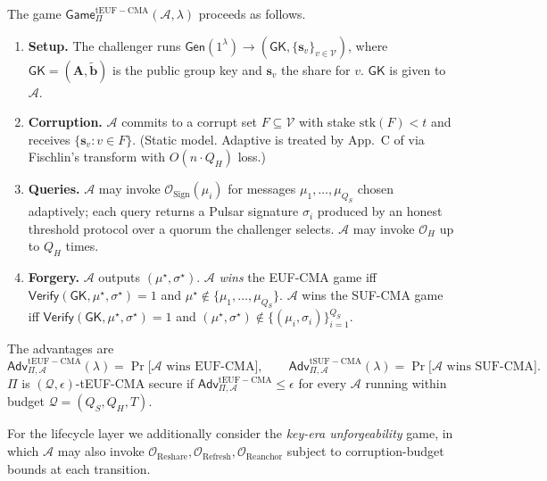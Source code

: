 \begin{definition}
\label{def:tuf-cma}
The game $\mathsf{Game}^{\mathrm{tEUF-CMA}}_{\Pi}(\mathcal{A}, \lambda)$
proceeds as follows.
\begin{enumerate}[nosep, leftmargin=2em]
  \item \textbf{Setup.} The challenger runs $\mathsf{Gen}(1^\lambda) \to
        (\mathsf{GK}, \{\mathbf{s}_v\}_{v \in \mathcal{V}})$, where
        $\mathsf{GK} = (\mathbf{A}, \tilde{\mathbf{b}})$ is the public
        group key and $\mathbf{s}_v$ the share for $v$. $\mathsf{GK}$
        is given to $\mathcal{A}$.
  \item \textbf{Corruption.} $\mathcal{A}$ commits to a corrupt set
        $F \subseteq \mathcal{V}$ with stake $\mathrm{stk}(F) < t$ and
        receives $\{\mathbf{s}_v : v \in F\}$. (Static model. Adaptive
        is treated by App.~C of \cite{quasarcertsoundness} via
        Fischlin's transform with $O(n \cdot Q_H)$ loss.)
  \item \textbf{Queries.} $\mathcal{A}$ may invoke
        $\mathcal{O}_{\mathrm{Sign}}(\mu_i)$ for messages
        $\mu_1, \ldots, \mu_{Q_S}$ chosen adaptively; each query returns
        a Pulsar signature $\sigma_i$ produced by an honest threshold
        protocol over a quorum the challenger selects.
        $\mathcal{A}$ may invoke $\mathcal{O}_H$ up to $Q_H$ times.
  \item \textbf{Forgery.} $\mathcal{A}$ outputs
        $(\mu^\star, \sigma^\star)$.
        $\mathcal{A}$ \emph{wins} the EUF-CMA game iff
        $\mathsf{Verify}(\mathsf{GK}, \mu^\star, \sigma^\star) = 1$ and
        $\mu^\star \notin \{\mu_1, \ldots, \mu_{Q_S}\}$.
        $\mathcal{A}$ wins the SUF-CMA game iff
        $\mathsf{Verify}(\mathsf{GK}, \mu^\star, \sigma^\star) = 1$ and
        $(\mu^\star, \sigma^\star) \notin \{(\mu_i, \sigma_i)\}_{i=1}^{Q_S}$.
\end{enumerate}
The advantages are
\[
  \mathsf{Adv}^{\mathrm{tEUF-CMA}}_{\Pi, \mathcal{A}}(\lambda)
  = \Pr\bigl[\mathcal{A} \text{ wins EUF-CMA}\bigr],
  \qquad
  \mathsf{Adv}^{\mathrm{tSUF-CMA}}_{\Pi, \mathcal{A}}(\lambda)
  = \Pr\bigl[\mathcal{A} \text{ wins SUF-CMA}\bigr].
\]
$\Pi$ is $(\mathcal{Q}, \epsilon)$-tEUF-CMA secure if
$\mathsf{Adv}^{\mathrm{tEUF-CMA}}_{\Pi, \mathcal{A}} \leq \epsilon$ for
every $\mathcal{A}$ running within budget $\mathcal{Q} = (Q_S, Q_H, T)$.
\end{definition}

For the lifecycle layer we additionally consider the
\emph{key-era unforgeability} game, in which $\mathcal{A}$ may also
invoke $\mathcal{O}_{\mathrm{Reshare}}, \mathcal{O}_{\mathrm{Refresh}},
\mathcal{O}_{\mathrm{Reanchor}}$ subject to corruption-budget bounds at
each transition.


